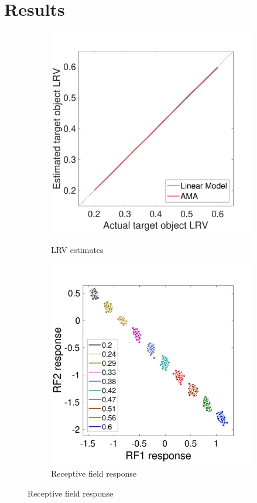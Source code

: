 \documentclass{jov}
\begin{document}
\section{Results} \label{Results}
\begin{figure}
\centering
            \begin{subfigure}[b]{0.25 \textwidth}
        \caption{LRV estimates}
        \includegraphics[width=\textwidth, trim={0 0 0 1.3cm},clip]{../FiguresDraft4/Figure10/Figure10_a.pdf}
        \label{fig:case1Estimates}
    \end{subfigure} 
        \begin{subfigure}[b]{0.26 \textwidth}
        \caption{Receptive field response}
        \includegraphics[width=\textwidth, trim={0 3mm 0 15mm},clip]{../FiguresDraft4/Figure10/Figure10_b.pdf}

\end{subfigure}
\end{figure}
\end{document}
